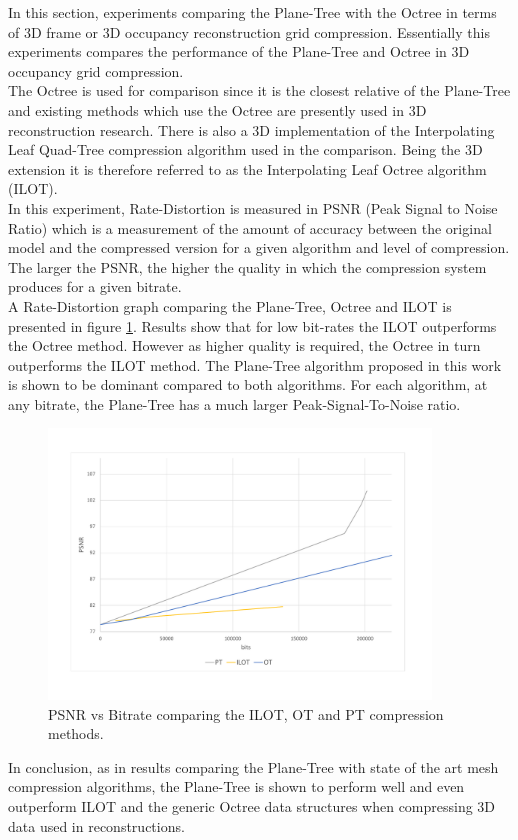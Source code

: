 
In this section, experiments comparing the Plane-Tree with the Octree in terms of 3D frame or 3D occupancy reconstruction grid compression. Essentially this experiments compares the performance of the Plane-Tree and Octree in 3D occupancy grid compression. \\

The Octree is used for comparison since it is the closest relative of the Plane-Tree and existing methods which use the Octree are presently used in 3D reconstruction research. There is also a 3D implementation of the Interpolating Leaf Quad-Tree \cite{Lincoln13Interpolating} compression algorithm used in the comparison. Being the 3D extension it is therefore referred to as the Interpolating Leaf Octree algorithm (ILOT). \\

In this experiment, Rate-Distortion is measured in PSNR (Peak Signal to Noise Ratio) which is a measurement of the amount of accuracy between the original model and the compressed version for a given algorithm and level of compression. The larger the PSNR, the higher the quality in which the compression system produces for a given bitrate. \\

A Rate-Distortion graph comparing the Plane-Tree, Octree and ILOT is presented in figure \ref{fig:3DReconCompression1}. Results show that for low bit-rates the ILOT outperforms the Octree method. However as higher quality is required, the Octree in turn outperforms the ILOT method. The Plane-Tree algorithm proposed in this work is shown to be dominant compared to both algorithms. For each algorithm, at any bitrate, the Plane-Tree has a much larger Peak-Signal-To-Noise ratio. \\

\begin{figure}[!htb]
\centering
\includegraphics[width=4.0in]{images/results/compression/psnr1}
\caption{PSNR vs Bitrate comparing the ILOT, OT and PT compression methods.}
\label{fig:3DReconCompression1}
\end{figure}

In conclusion, as in results comparing the Plane-Tree with state of the art mesh compression algorithms, the Plane-Tree is shown to perform well and even outperform ILOT and the generic Octree data structures when compressing 3D data used in reconstructions. 
